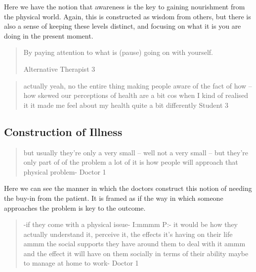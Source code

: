 Here we have the notion that awareness is the key to gaining nourishment from the physical world. Again, this is constructed as wisdom from others, but there is also a sense of keeping these levels distinct, and focusing on what it is you are doing in the present moment. 

\begin{quotation}
  
By paying attention to what is (pause) going on with yourself.

Alternative Therapist 3
\end{quotation}

\begin{quotation}
  actually yeah, no the entire thing making people aware of the fact of how – how skewed our perceptions of health are a bit cos when I kind of realised it it made me feel about my health quite a bit differently
Student 3
\end{quotation}




\subsection{Construction of Illness}
\label{sec:construction-illness}

\begin{quotation}
  but usually they're only a very small – well not a very small – but they're only part of of the problem a lot of it is how people will approach that physical problem-
Doctor 1
\end{quotation}

Here  we can see the manner in which the doctors construct this notion of needing the buy-in from the patient. It is framed as if the way in which someone approaches the problem is key to the outcome. 

\begin{quotation}
  -if they come with a physical issue-
I:mmmm
P:- it would be how they actually understand it, perceive it, the effects it's having on their life ammm the social supports they have around them to deal with it ammm and the effect it will have on them socially in terms of their ability maybe to manage at home to work-
Doctor 1
\end{quotation}

